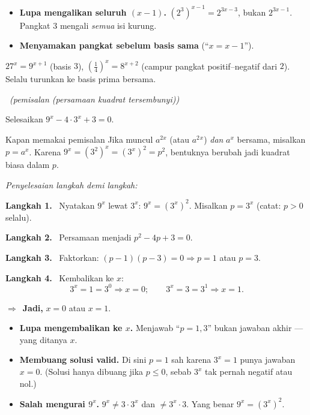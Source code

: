 \documentclass[11pt,a4paper]{report}
\theoremstyle{gaya}
\newcommand{\jawab}{\par\smallskip\noindent\textit{\textcolor{oranye}{Penyelesaian langkah demi langkah:}}\par\smallskip}
\newcommand{\langkah}[1]{\par\smallskip\noindent\textbf{\textcolor{biru}{Langkah #1.}}\ }
\newcommand{\jadi}{\par\smallskip\noindent$\Rightarrow$\ \textbf{Jadi, }}
\newcommand{\soalno}[2]{%
  \par\bigskip
  \noindent{\large\bfseries\color{ungu}\rule[-2pt]{4pt}{14pt}\ Soal #1}%
  \ {\normalfont\itshape\color{gray}(#2)}\par\nopagebreak\smallskip}
\begin{document}
\begin{jebakan}
\begin{itemize}[leftmargin=*,topsep=2pt]
  \item \textbf{Lupa mengalikan seluruh $(x-1)$.} $(2^3)^{x-1}=2^{3x-3}$, bukan
  $2^{3x-1}$. Pangkat $3$ mengali \emph{semua} isi kurung.
  \item \textbf{Menyamakan pangkat sebelum basis sama} (``$x=x-1$'').
\end{itemize}
\end{jebakan}

\begin{variasi}
$27^{x}=9^{x+1}$ (basis $3$), $\left(\tfrac14\right)^x = 8^{x+2}$ (campur pangkat
positif--negatif dari $2$). Selalu turunkan ke basis prima bersama.
\end{variasi}

\soalno{1.2.4}{pemisalan (persamaan kuadrat tersembunyi)}
\begin{soalbox}{}
Selesaikan $9^{x} - 4\cdot 3^{x} + 3 = 0$.
\end{soalbox}

\begin{ingat}{Kapan memakai pemisalan}
Jika muncul $a^{2x}$ (atau $a^{2}{}^{x}$) \emph{dan} $a^{x}$ bersama, misalkan
$p=a^{x}$. Karena $9^x=(3^2)^x=(3^x)^2=p^2$, bentuknya berubah jadi kuadrat biasa
dalam $p$.
\end{ingat}

\jawab
\langkah{1} Nyatakan $9^x$ lewat $3^x$: $9^x=(3^x)^2$. Misalkan $p=3^x$
(catat: $p>0$ selalu).
\langkah{2} Persamaan menjadi $p^2 - 4p + 3 = 0$.
\langkah{3} Faktorkan: $(p-1)(p-3)=0 \Rightarrow p=1$ atau $p=3$.
\langkah{4} Kembalikan ke $x$:
\[
3^x = 1 = 3^0 \Rightarrow x=0; \qquad 3^x = 3 = 3^1 \Rightarrow x=1.
\]
\jadi $x=0$ atau $x=1$.

\begin{jebakan}
\begin{itemize}[leftmargin=*,topsep=2pt]
  \item \textbf{Lupa mengembalikan ke $x$.} Menjawab ``$p=1,3$'' bukan jawaban
  akhir --- yang ditanya $x$.
  \item \textbf{Membuang solusi valid.} Di sini $p=1$ sah karena $3^x=1$ punya
  jawaban $x=0$. (Solusi hanya dibuang jika $p\le0$, sebab $3^x$ tak pernah
  negatif atau nol.)
  \item \textbf{Salah mengurai $9^x$.} $9^x\neq 3\cdot3^x$ dan $\neq 3^{x}\cdot 3$.
  Yang benar $9^x=(3^x)^2$.
\end{itemize}
\end{jebakan}
\end{document}
